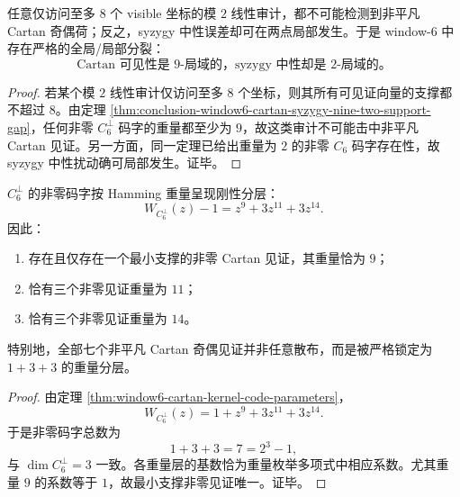 \begin{corollary}[局部审计盲区]\label{cor:conclusion-window6-local-audit-blind-zone-for-cartan}
任意仅访问至多 \(8\) 个 visible 坐标的模 \(2\) 线性审计，都不可能检测到非平凡 Cartan 奇偶荷；反之，syzygy 中性误差却可在两点局部发生。于是 window-\(6\) 中存在严格的全局/局部分裂：
\[
\text{Cartan 可见性是 \(9\)-局域的，syzygy 中性却是 \(2\)-局域的。}
\]
\end{corollary}
\begin{proof}
若某个模 \(2\) 线性审计仅访问至多 \(8\) 个坐标，则其所有可见证向量的支撑都不超过 \(8\)。由定理 \ref{thm:conclusion-window6-cartan-syzygy-nine-two-support-gap}，任何非零 \(C_6^\perp\) 码字的重量都至少为 \(9\)，故这类审计不可能击中非平凡 Cartan 见证。另一方面，同一定理已给出重量为 \(2\) 的非零 \(C_6\) 码字存在性，故 syzygy 中性扰动确可局部发生。证毕。
\end{proof}

\begin{theorem}\label{thm:conclusion-window6-unique-minimal-cartan-witness}
\(C_6^\perp\) 的非零码字按 Hamming 重量呈现刚性分层：
\[
W_{C_6^\perp}(z)-1=z^9+3z^{11}+3z^{14}.
\]
因此：
\begin{enumerate}
  \item 存在且仅存在一个最小支撑的非零 Cartan 见证，其重量恰为 \(9\)；
  \item 恰有三个非零见证重量为 \(11\)；
  \item 恰有三个非零见证重量为 \(14\)。
\end{enumerate}
特别地，全部七个非平凡 Cartan 奇偶见证并非任意散布，而是被严格锁定为 \(1+3+3\) 的重量分层。
\end{theorem}
\begin{proof}
由定理 \ref{thm:window6-cartan-kernel-code-parameters}，
\[
W_{C_6^\perp}(z)=1+z^9+3z^{11}+3z^{14}.
\]
于是非零码字总数为
\[
1+3+3=7=2^3-1,
\]
与 \(\dim C_6^\perp=3\) 一致。各重量层的基数恰为重量枚举多项式中相应系数。尤其重量 \(9\) 的系数等于 \(1\)，故最小支撑非零见证唯一。证毕。
\end{proof}

